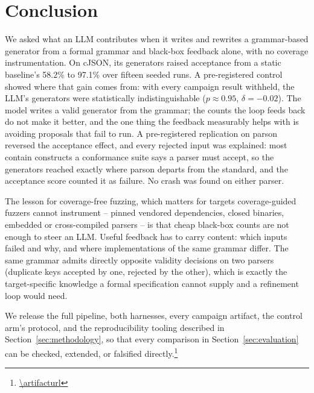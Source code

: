 \section{Conclusion}
\label{sec:conclusion}

We asked what an LLM contributes when it writes and rewrites a grammar-based
generator from a formal grammar and black-box feedback alone, with no
coverage instrumentation. On cJSON, its generators raised acceptance from a
static baseline's 58.2\% to 97.1\% over fifteen seeded runs. A pre-registered
control showed where that gain comes from: with every campaign result
withheld, the LLM's generators were statistically indistinguishable
($p \approx 0.95$, $\delta = -0.02$). The model writes a valid generator from
the grammar; the counts the loop feeds back do not make it better, and the
one thing the feedback measurably helps with is avoiding proposals that fail
to run. A pre-registered replication on parson reversed the acceptance
effect, and every rejected input was explained: most contain constructs a
conformance suite says a parser must accept, so the generators reached
exactly where parson departs from the standard, and the acceptance score
counted it as failure. No crash was found on either parser.

The lesson for coverage-free fuzzing, which matters for targets
coverage-guided fuzzers cannot instrument -- pinned vendored dependencies,
closed binaries, embedded or cross-compiled parsers -- is that cheap
black-box counts are not enough to steer an LLM. Useful feedback has to
carry content: which inputs failed and why, and where implementations of
the same grammar differ. The same grammar admits directly opposite validity
decisions on two parsers (duplicate keys accepted by one, rejected by the
other), which is exactly the target-specific knowledge a formal
specification cannot supply and a refinement loop would need.

We release the full pipeline, both harnesses, every campaign artifact, the
control arm's protocol, and the reproducibility tooling described in
Section~\ref{sec:methodology}, so that every comparison in
Section~\ref{sec:evaluation} can be checked, extended, or falsified
directly.\footnote{\url{\artifacturl}}
